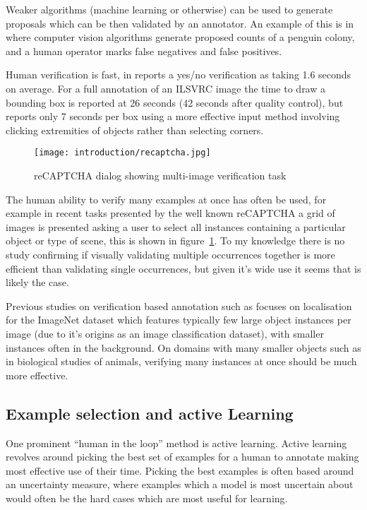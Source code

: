 Weaker algorithms (machine learning or otherwise) can be used to generate proposals which can be then validated by an annotator. An example of this is in \cite{McNeill2011} where computer vision algorithms generate proposed counts of a penguin colony, and a human operator marks false negatives and false positives.

Human verification is fast, in \cite{Papadopoulos2016} reports a yes/no verification as taking 1.6 seconds on average. For a full annotation of an \gls{ILSVRC} image \cite {Su2012a} the time to draw a bounding box is reported at 26 seconds (42 seconds after quality control), but \cite{Papadopoulos2017} reports only 7 seconds per box using a more effective input method involving clicking extremities of objects rather than selecting corners. 

\begin{figure}[h]
  \centering
  \texttt{[image: introduction/recaptcha.jpg]}
  \caption{reCAPTCHA dialog showing multi-image verification task}  
  \label{fig:captcha}
\end{figure}

The human ability to verify many examples at once has often be used, for example in recent tasks presented by the well known reCAPTCHA \cite{von2008recaptcha} a grid of images is presented asking a user to select all instances containing a particular object or type of scene, this is shown in figure~\ref{fig:captcha}. To my knowledge there is no study confirming if visually validating multiple occurrences together is more efficient than validating single occurrences, but given it's wide use it seems that is likely the case. 

Previous studies on verification based annotation such as \cite{Papadopoulos2016} focuses on localisation for the ImageNet dataset which features typically few large object instances per image (due to it's origins as an image classification dataset), with smaller instances often in the background. On domains with many smaller objects such as in biological studies of animals, verifying many instances at once should be much more effective. 


\subsection{Example selection and active Learning} 

One prominent ``human in the loop'' method is active learning. Active learning revolves around picking the best set of examples for a human to annotate making most effective use of their time. Picking the best examples is often based around an uncertainty measure, where examples which a model is most uncertain about would often be the hard cases which are most useful for learning. 
 
